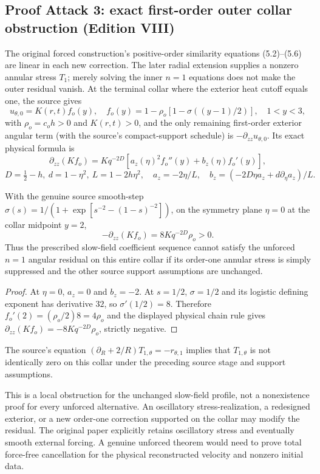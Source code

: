 \subsection*{Proof Attack 3: exact first-order outer collar obstruction (Edition VIII)}
\label{subsec:n1-outer-collar-obstruction-VIII}
The original forced construction's positive-order similarity equations
(5.2)--(5.6) are linear in each new correction. The later radial
extension supplies a nonzero annular stress $T_1$; merely solving
the inner $n=1$ equations does not make the outer residual vanish.
At the terminal collar where the exterior heat cutoff equals one,
the source gives
\[
u_{\theta,0}=K(r,t)f_o(y),\quad
f_o(y)=1-\rho_o[1-\sigma((y-1)/2)],\quad1<y<3,
\]
with $\rho_o=c_oh>0$ and $K(r,t)>0$, and the only remaining first-order
exterior angular term (with the source's compact-support schedule)
is $-\partial_{zz}u_{\theta,0}$. Its exact physical formula is
\[
\partial_{zz}(Kf_o)=Kq^{-2D}
[a_z(\eta)^2f_o''(y)+b_z(\eta)f_o'(y)],
\]
\[
D=\tfrac12-h,\ d=1-\eta^2,\ L=1-2h\eta^2,\quad
a_z=-2\eta/L,\quad
b_z=(-2D\eta a_z+d\partial_\eta a_z)/L.
\]
\begin{proposition}
With the genuine source smooth-step
$\sigma(s)=1/(1+\exp[s^{-2}-(1-s)^{-2}])$, on the symmetry plane
$\eta=0$ at the collar midpoint $y=2$,
\begin{equation}\label{eq:n1-outer-collar-obstruction-VIII}
\boxed{-\partial_{zz}(Kf_o)=8Kq^{-2D}\rho_o>0.}
\end{equation}
Thus the prescribed slow-field coefficient sequence cannot satisfy
the unforced $n=1$ angular residual on this entire collar if its
order-one annular stress is simply suppressed and the other source
support assumptions are unchanged.
\end{proposition}
\begin{proof}
At $\eta=0$, $a_z=0$ and $b_z=-2$.
At $s=1/2$, $\sigma=1/2$ and its logistic defining exponent
has derivative $32$, so $\sigma'(1/2)=8$.
Therefore $f_o'(2)=(\rho_o/2)8=4\rho_o$ and the displayed
physical chain rule gives $\partial_{zz}(Kf_o)
=-8Kq^{-2D}\rho_o$, strictly negative.
\end{proof}
\begin{corollary}
The source's equation
$(\partial_R+2/R)T_{1,\theta}=-r_{\theta,1}$
implies that $T_{1,\theta}$ is not identically zero on this
collar under the preceding source stage and support assumptions.
\end{corollary}
This is a local obstruction for the unchanged slow-field profile,
not a nonexistence proof for every unforced alternative.
An oscillatory stress-realization, a redesigned exterior,
or a new order-one correction supported on the collar may modify
the residual. The original paper explicitly retains oscillatory
stress and eventually smooth external forcing. A genuine unforced
theorem would need to prove total force-free cancellation for the
physical reconstructed velocity and nonzero initial data.

